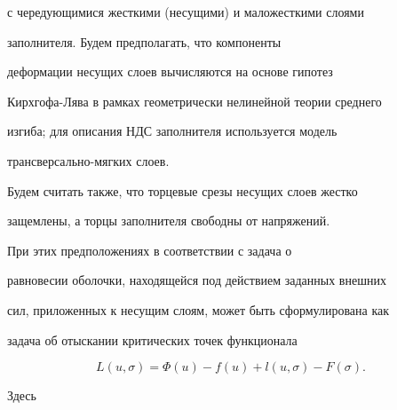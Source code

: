с чередующимися жесткими (несущими) и маложесткими слоями


заполнителя. Будем предполагать, что компоненты


деформации несущих слоев вычисляются на основе гипотез


Кирхгофа-Лява в рамках геометрически нелинейной теории среднего


изгиба; для описания НДС заполнителя используется модель 


транс\-вер\-саль\-но-мягких слоев.


Будем считать также, что торцевые срезы несущих слоев жестко


защемлены, а торцы заполнителя свободны от напряжений.





При этих предположениях в соответствии с \cite{P1} задача о


равновесии оболочки, находящейся под действием заданных внешних


сил, приложенных к несущим слоям, может быть сформулирована как


задача об отыскании критических точек функционала


\begin{equation}\label{L}


L(u,\sigma) = \Phi (u) - f(u) + l(u, \sigma) - F( \sigma).


\end{equation}


Здесь 


